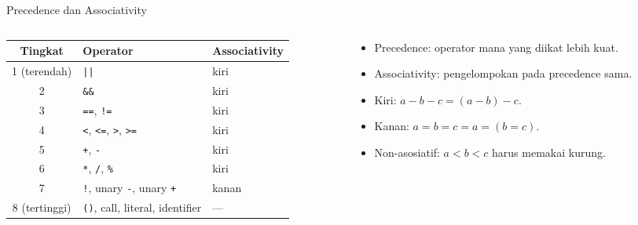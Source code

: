 \documentclass[aspectratio=169,10pt,t]{beamer}
\begin{document}
\begin{frame}{Precedence dan Associativity}
  \begin{columns}[T,onlytextwidth]
    \begin{column}{0.58\textwidth}
      \scriptsize
      \setlength{\tabcolsep}{4pt}
      \begin{tabular}{@{}c l l@{}}
        \toprule
        \textbf{Tingkat} & \textbf{Operator} & \textbf{Associativity} \\
        \midrule
        1 (terendah) & \texttt{||} & kiri \\
        2 & \texttt{\&\&} & kiri \\
        3 & \texttt{==}, \texttt{!=} & kiri \\
        4 & \texttt{<}, \texttt{<=}, \texttt{>}, \texttt{>=} & kiri \\
        5 & \texttt{+}, \texttt{-} & kiri \\
        6 & \texttt{*}, \texttt{/}, \texttt{\%} & kiri \\
        7 & \texttt{!}, unary \texttt{-}, unary \texttt{+} & kanan \\
        8 (tertinggi) & \texttt{()}, call, literal, identifier & --- \\
        \bottomrule
      \end{tabular}
    \end{column}
    \begin{column}{0.38\textwidth}
      \begin{itemize}
        \item Precedence: operator mana yang diikat lebih kuat.
        \item Associativity: pengelompokan pada precedence sama.
        \item Kiri: \(a-b-c=(a-b)-c\).
        \item Kanan: \(a=b=c=a=(b=c)\).
        \item Non-asosiatif: \(a<b<c\) harus memakai kurung.
      \end{itemize}
    \end{column}
  \end{columns}
\end{frame}
\end{document}

